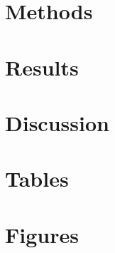 \documentclass[12pt]{dallasLab}
\begin{document}
\section*{Methods}

\paragraph*{}






\section*{Results}

\paragraph*{}









\section*{Discussion}


\paragraph*{}



\paragraph*{}



\paragraph*{}



\newpage





\section*{Tables}




\section*{Figures}
\end{document}
